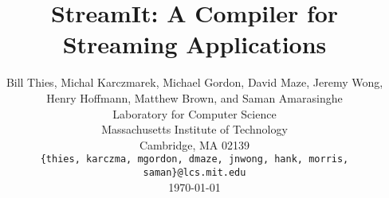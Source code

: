\documentclass[psfig]{acm_proc_article-sp}
\begin{document}
\title{StreamIt: A Compiler for Streaming Applications}

\author{
\alignauthor \vspace{-18pt} 
Bill Thies, 
Michal Karczmarek, 
Michael Gordon, 
David Maze, 
Jeremy Wong,
Henry Hoffmann, 
Matthew Brown, 
and Saman Amarasinghe\\
	\vspace{12pt}
	Laboratory for Computer Science \\
	Massachusetts Institute of Technology \\
	Cambridge, MA  02139 \\
	\vspace{12pt}
	{\tt \{thies, karczma, mgordon, dmaze, jnwong, hank, morris, saman\}@lcs.mit.edu} \\
	\vspace{12pt}
        \today
}

\newcommand{\ma}[2]{max_{#1 \rightarrow #2}}
\newcommand{\mi}[2]{min_{#1 \leftarrow #2}}
\newcommand{\floor}[2]{\left\lfloor\frac{#1}{#2}\right\rfloor}
\newcommand{\ceil}[2]{\left\lceil\frac{#1}{#2}\right\rceil}
\newtheorem{definition}{Definition}
\newcommand{\ra}[0]{\rightarrow}

\maketitle

\begin{abstract}
%
\end{abstract}

%
%


%
%


\end{document}
